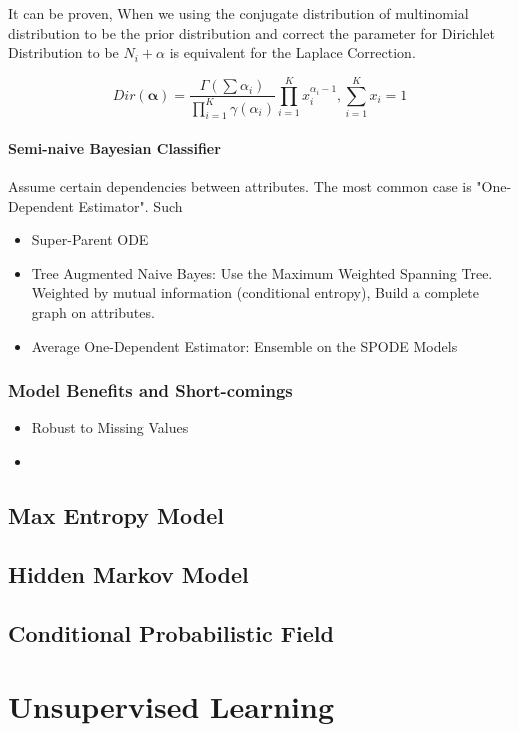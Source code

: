 \documentclass[11pt, openany]{book}              %
\begin{document}
It can be proven, When we using the conjugate distribution of multinomial distribution to be the prior distribution and correct the parameter for Dirichlet Distribution to be $N_i+\alpha$ is equivalent for the Laplace Correction.

$$Dir(\mathbf{\alpha}) = \frac{\Gamma(\sum\alpha_i)}{\prod_{i=1}^K \gamma(\alpha_i)} \prod_{i=1}^K x_i^{\alpha_i-1}, \sum_{i=1}^K x_i =1$$

\subsection{Semi-naive Bayesian Classifier}

Assume certain dependencies between attributes. The most common case is "One-Dependent Estimator". Such 

\begin{itemize}
	\item Super-Parent ODE
	\item Tree Augmented Naive Bayes: Use the Maximum Weighted Spanning Tree. Weighted by mutual information (conditional entropy), Build a complete graph on attributes. 
	\item Average One-Dependent Estimator: Ensemble on the SPODE Models 	
\end{itemize}

\section{Model Benefits and Short-comings}

\begin{itemize}
	\item Robust to Missing Values
	\item 
\end{itemize}

\chapter{Max Entropy Model}
\chapter{Hidden Markov Model}
\chapter{Conditional Probabilistic Field}

\part{Unsupervised Learning}
\end{document}
